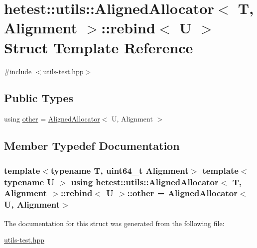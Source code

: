 \hypertarget{structhetest_1_1utils_1_1AlignedAllocator_1_1rebind}{\section{hetest\-:\-:utils\-:\-:Aligned\-Allocator$<$ T, Alignment $>$\-:\-:rebind$<$ U $>$ Struct Template Reference}
\label{structhetest_1_1utils_1_1AlignedAllocator_1_1rebind}
}


{\ttfamily \#include $<$utils-\/test.\-hpp$>$}

\subsection*{Public Types}
\begin{DoxyCompactItemize}
\item 
using \hyperlink{structhetest_1_1utils_1_1AlignedAllocator_1_1rebind_ac55bc630e5d5c06ccfb3cdfe249f0a47}{other} = \hyperlink{classhetest_1_1utils_1_1AlignedAllocator}{Aligned\-Allocator}$<$ U, Alignment $>$
\end{DoxyCompactItemize}


\subsection{Member Typedef Documentation}
\hypertarget{structhetest_1_1utils_1_1AlignedAllocator_1_1rebind_ac55bc630e5d5c06ccfb3cdfe249f0a47}{
\subsubsection[{other}]{\setlength{\rightskip}{0pt plus 5cm}template$<$typename T, uint64\-\_\-t Alignment$>$ template$<$typename U $>$ using {\bf hetest\-::utils\-::\-Aligned\-Allocator}$<$ T, Alignment $>$\-::{\bf rebind}$<$ U $>$\-::{\bf other} =  {\bf Aligned\-Allocator}$<$U, Alignment$>$}}\label{structhetest_1_1utils_1_1AlignedAllocator_1_1rebind_ac55bc630e5d5c06ccfb3cdfe249f0a47}


The documentation for this struct was generated from the following file\-:\begin{DoxyCompactItemize}
\item 
\hyperlink{utils-test_8hpp}{utils-\/test.\-hpp}\end{DoxyCompactItemize}
